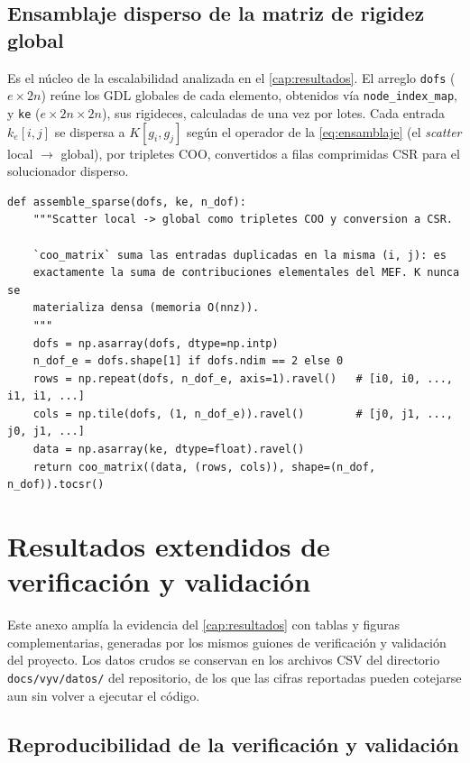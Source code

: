 \section{Ensamblaje disperso de la matriz de rigidez global}

Es el núcleo de la escalabilidad analizada en el \autoref{cap:resultados}. El arreglo \texttt{dofs} ($e\times 2n$) reúne los GDL globales de cada elemento, obtenidos vía \texttt{node\_index\_map}, y \texttt{ke} ($e\times 2n\times 2n$), sus rigideces, calculadas de una vez por lotes. Cada entrada $k_e[i,j]$ se dispersa a $K[g_i, g_j]$ según el operador de la \autoref{eq:ensamblaje} (el \emph{scatter} local $\to$ global), por tripletes COO, convertidos a filas comprimidas CSR para el solucionador disperso.

\begin{lstlisting}
def assemble_sparse(dofs, ke, n_dof):
    """Scatter local -> global como tripletes COO y conversion a CSR.

    `coo_matrix` suma las entradas duplicadas en la misma (i, j): es
    exactamente la suma de contribuciones elementales del MEF. K nunca se
    materializa densa (memoria O(nnz)).
    """
    dofs = np.asarray(dofs, dtype=np.intp)
    n_dof_e = dofs.shape[1] if dofs.ndim == 2 else 0
    rows = np.repeat(dofs, n_dof_e, axis=1).ravel()   # [i0, i0, ..., i1, i1, ...]
    cols = np.tile(dofs, (1, n_dof_e)).ravel()        # [j0, j1, ..., j0, j1, ...]
    data = np.asarray(ke, dtype=float).ravel()
    return coo_matrix((data, (rows, cols)), shape=(n_dof, n_dof)).tocsr()
\end{lstlisting}


\chapter{Resultados extendidos de verificación y validación}
\label{anexo:vyv}

Este anexo amplía la evidencia del \autoref{cap:resultados} con tablas y figuras complementarias, generadas por los mismos guiones de verificación y validación del proyecto. Los datos crudos se conservan en los archivos CSV del directorio \texttt{docs/vyv/datos/} del repositorio, de los que las cifras reportadas pueden cotejarse aun sin volver a ejecutar el código.

\section{Reproducibilidad de la verificación y validación}
\label{sec:vyv-reproducibilidad}

